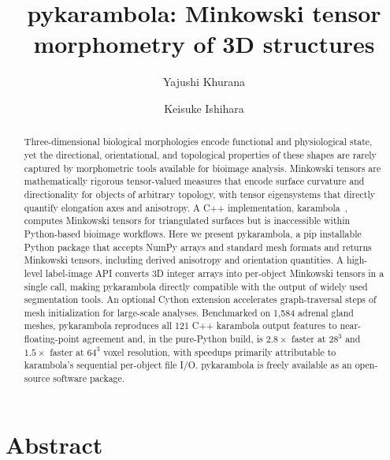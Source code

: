 \documentclass[times, twoside, watermark]{zHenriquesLab-StyleBioRxiv}
\begin{document}
\title{pykarambola: Minkowski tensor morphometry of 3D structures}

\author[1, \Letter]{Yajushi Khurana}
\author[1,2,\Letter]{Keisuke Ishihara}

\maketitle


\section*{Abstract}

\begin{abstract}
Three-dimensional biological morphologies encode functional and physiological state, yet the directional, orientational, and topological properties of these shapes are rarely captured by morphometric tools available for bioimage analysis.
Minkowski tensors are mathematically rigorous tensor-valued measures that encode surface curvature and directionality for objects of arbitrary topology, with tensor eigensystems that directly quantify elongation axes and anisotropy.
A C++ implementation, karambola~\cite{Schaller2020karambola}, computes Minkowski tensors for triangulated surfaces but is inaccessible within Python-based bioimage workflows.
Here we present pykarambola, a pip installable Python package that accepts NumPy arrays and standard mesh formats and returns Minkowski tensors, including derived anisotropy and orientation quantities.
A high-level label-image API converts 3D integer arrays into per-object Minkowski tensors in a single call, making pykarambola directly compatible with the output of widely used segmentation tools.
An optional Cython extension accelerates graph-traversal steps of mesh initialization for large-scale analyses.
Benchmarked on 1{,}584 adrenal gland meshes, pykarambola reproduces all 121 C++ karambola output features to near-floating-point agreement and, in the pure-Python build, is $2.8\times$ faster at $28^3$ and $1.5\times$ faster at $64^3$ voxel resolution, with speedups primarily attributable to karambola's sequential per-object file I/O.
pykarambola is freely available as an open-source software package.
\end{abstract}
\end{document}
